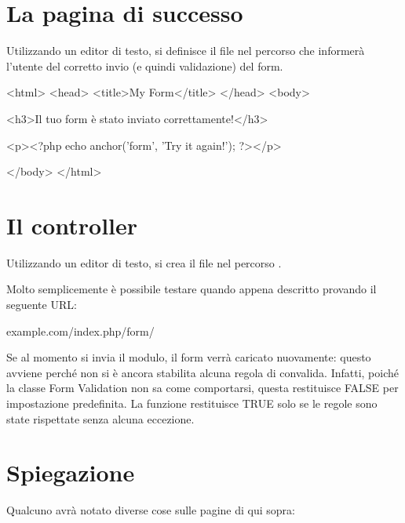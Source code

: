 \section*{La pagina di successo}
Utilizzando un editor di testo, si definisce il file  nel percorso  che informerà l'utente del corretto invio (e quindi validazione) del form.

\begin{html}
<html>
<head>
<title>My Form</title>
</head>
<body>

<h3>Il tuo form è stato inviato correttamente!</h3>

<p><?php echo anchor('form', 'Try it again!'); ?></p>

</body>
</html>
\end{html}

\section*{Il controller}
Utilizzando un editor di testo, si crea il file  nel percorso .


Molto semplicemente è possibile testare quando appena descritto provando il seguente \ac{URL}:

\begin{code}
example.com/index.php/form/
\end{code}

Se al momento si invia il modulo, il form verrà caricato nuovamente: questo avviene perché non si è ancora stabilita alcuna regola di convalida. Infatti, poiché la classe Form Validation non sa come comportarsi, questa restituisce FALSE per impostazione predefinita. La funzione  restituisce TRUE solo se le regole sono state rispettate senza alcuna eccezione.

\section*{Spiegazione}
Qualcuno avrà notato diverse cose sulle pagine di qui sopra:

